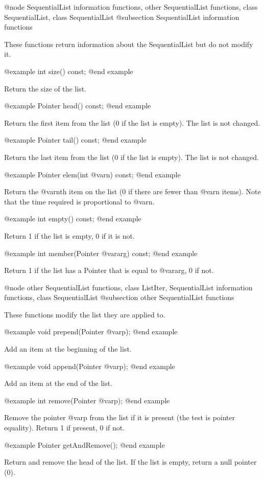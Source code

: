 @node SequentialList information functions, other SequentialList functions, class SequentialList, class SequentialList
@subsection SequentialList information functions

These functions return information about the SequentialList but do not
modify it.

@example
int size() const;
@end example

Return the size of the list.

@example
Pointer head() const;
@end example

Return the first item from the list (0 if the list is empty).  The
list is not changed.

@example
Pointer tail() const;
@end example

Return the last item from the list (0 if the list is empty).  The
list is not changed.

@example
Pointer elem(int @var{n}) const;
@end example

Return the @var{n}th item on the list (0 if there are fewer than @var{n} items).
Note that the time required is proportional to @var{n}.

@example
int empty() const;
@end example

Return 1 if the list is empty, 0 if it is not.

@example
int member(Pointer @var{arg}) const;
@end example

Return 1 if the list has a Pointer that is equal to @var{arg}, 0 if not.

@node other SequentialList functions, class ListIter, SequentialList information functions, class SequentialList
@subsection other SequentialList functions

These functions modify the list they are applied to.

@example
void prepend(Pointer @var{p});
@end example

Add an item at the beginning of the list.

@example
void append(Pointer @var{p});
@end example

Add an item at the end of the list.

@example
int remove(Pointer @var{p});
@end example

Remove the pointer @var{p} from the list if it is present (the test is pointer
equality).  Return 1 if present, 0 if not.

@example
Pointer getAndRemove();
@end example

Return and remove the head of the list.  If the list is empty, return
a null pointer (0).

